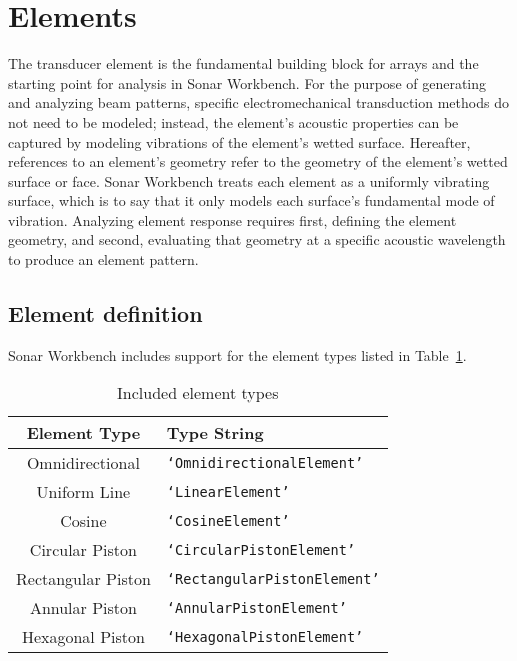 \section{Elements}\label{sec:element}

The transducer element is the fundamental building block for arrays and the starting point for analysis in Sonar Workbench. For the purpose of generating and analyzing beam patterns, specific electromechanical transduction methods do not need to be modeled; instead, the element's acoustic properties can be captured by modeling vibrations of the element's wetted surface. Hereafter, references to an element's geometry refer to the geometry of the element's wetted surface or face. Sonar Workbench treats each element as a uniformly vibrating surface, which is to say that it only models each surface's fundamental mode of vibration. Analyzing element response requires first, defining the element geometry, and second, evaluating that geometry at a specific acoustic wavelength to produce an element pattern.

\subsection{Element definition}

Sonar Workbench includes support for the element types listed in Table~\ref{tab:ElementTypes}. 

\begin{table}[!ht]
	\begin{center}
		\caption{Included element types}
		\label{tab:ElementTypes}
		\begin{tabular}{c|l} 
			\textbf{Element Type} & \textbf{Type String} \\
			\hline
			Omnidirectional  & \texttt{`OmnidirectionalElement'} \\
			Uniform Line & \texttt{`LinearElement'} \\
			Cosine & \texttt{`CosineElement'} \\
			Circular Piston & \texttt{`CircularPistonElement'} \\
			Rectangular Piston & \texttt{`RectangularPistonElement'} \\
			Annular Piston & \texttt{`AnnularPistonElement'} \\
			Hexagonal Piston & \texttt{`HexagonalPistonElement'} \\
		\end{tabular}
	\end{center}
\end{table}

